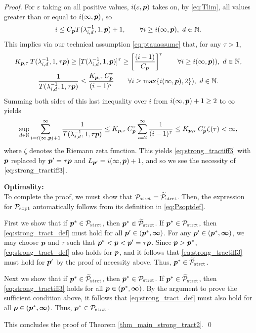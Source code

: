 \documentclass[sort&compress]{elsarticle}
\newcommand{\peter}[1]{\begingroup\color{purple}#1\endgroup}
\newcommand{\vinfty}{\boldsymbol{\infty}}
\begin{document}
\begin{proof}
For $\varepsilon$ taking on all positive values, $i(\varepsilon,\boldsymbol{p})$ takes on, \peter{by \eqref{eq:Tlim},} all values greater than or equal to $i(\infty,\boldsymbol{p})$, so
\[
i\le C_{\boldsymbol{p}} T(\lambda_{i,d}^{-1},1,\boldsymbol{p})+1, \qquad \forall i \ge i(\infty,\boldsymbol{p}), \ d \in \mathbb{N}.
\]
This implies via our technical assumption \eqref{eq:ptauassume} that, \peter{for any $\tau>1$,}
\begin{gather*}
 K_{\boldsymbol{p},\tau}\,T (\lambda_{i,d}^{-1},1,\tau \boldsymbol{p}) \ge
 [T(\lambda_{i,d}^{-1},1, \boldsymbol{p})]^\tau
 \ge
  \left[\frac{(i-1)}{C_{\boldsymbol{p}}}\right]^\tau \qquad \forall i \ge i(\infty,\boldsymbol{p})), \ d \in \mathbb{N}, \\
 \frac{1}{T (\lambda_{i,d}^{-1},1,\tau \boldsymbol{p})} \le
\frac{K_{\boldsymbol{p},\tau}\, C_{\boldsymbol{p}}^\tau}{(i-1)^\tau}\qquad \forall i \ge \max\{i(\infty,\boldsymbol{p}),2\}), \ d \in \mathbb{N} .
\end{gather*}
Summing both sides of this last inequality over $i$ from $i(\infty,\boldsymbol{p}) +1 \ge 2$ to $\vinfty$ yields
\begin{equation*}
\sup_{d\in\mathbb{N}} \sum_{i=i(\infty,\boldsymbol{p}) +1 }^\infty \frac{1}{T (\lambda_{i,d}^{-1},1, \tau \boldsymbol{p})}
 \le  K_{\boldsymbol{p},\tau}\, C_{\boldsymbol{p}}^\tau
\sum_{i=2}^\infty \frac{1}{(i-1)^\tau} \\
 \le K_{\boldsymbol{p},\tau}\, C_{\boldsymbol{p}}^\tau
\zeta (\tau)  < \infty,
\end{equation*}
where $\zeta$ denotes the Riemann zeta function.
This yields \eqref{eq:strong_tractiff3} with $\boldsymbol{p}$ replaced by $\boldsymbol{p}' = \tau \boldsymbol{p}$ and $L_{\boldsymbol{p}'} = i(\infty,\boldsymbol{p}) +1$, and so we see the necessity of $\eqref{eq:strong_tractiff3}$.

\bigskip
\noindent \textbf{Optimality:} \\
To complete the proof, we must show that $\mathcal{P}_{\textup{strct}} = \widetilde{\mathcal{P}}_{\textup{strct}}$.  Then, the expression for  $\mathcal{P}_{\textup{sopt}}$ automatically follows from its definition in \eqref{eq:Psoptdef}.

First we show  that if $\boldsymbol{p}^* \in \mathcal{P}_{\textup{strct}}$, then $\boldsymbol{p}^* \in \widetilde{\mathcal{P}}_{\textup{strct}}$.  If $\boldsymbol{p}^* \in \mathcal{P}_{\textup{strct}}$, then \eqref{eq:strong_tract_def} must hold for all $\vp' \in (\vp^*,\vinfty)$.  For any $\vp' \in (\vp^*,\vinfty)$, we may choose $\boldsymbol{p}$ and $\tau$ such that $\boldsymbol{p}^* < \boldsymbol{p} < \boldsymbol{p}' = \tau \boldsymbol{p}$. Since $\boldsymbol{p} > \boldsymbol{p}^*$, \eqref{eq:strong_tract_def} also holds for $\boldsymbol{p}$, and it follows that \eqref{eq:strong_tractiff3} must hold for $\boldsymbol{p}'$ by the proof of necessity above.  Thus, $\boldsymbol{p}^* \in \widetilde{\mathcal{P}}_{\textup{strct}}$.

Next we show that if $\boldsymbol{p}^* \in \widetilde{\mathcal{P}}_{\textup{strct}}$, then $\boldsymbol{p}^* \in \mathcal{P}_{\textup{strct}}$.  If $\boldsymbol{p}^* \in \widetilde{\mathcal{P}}_{\textup{strct}}$, then \eqref{eq:strong_tractiff3}  holds for all $\vp \in (\vp^*,\vinfty)$.  By the argument to prove the sufficient condition above, it follows that \eqref{eq:strong_tract_def} must also hold for all $\vp \in (\vp^*,\vinfty)$. Thus, $\boldsymbol{p}^* \in \mathcal{P}_{\textup{strct}}$.

\bigskip

\noindent This concludes the proof of  Theorem \ref{thm_main_strong_tract2}. \qed

\end{proof}
\end{document}
